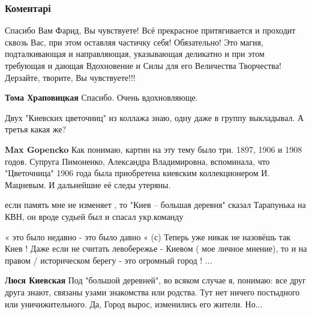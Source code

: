  
 
 
 
 
\subsubsection{Коментарі}

\begin{itemize} %

Спасибо Вам Фарид, Вы чувствуете! Всё прекрасное притягивается и проходит
сквозь Вас, при этом оставляя частичку себя! Обязательно! Это магия,
подталкивающая и направляющая, указывающая деликатно и при этом требующая и
дающая Вдохновение и Силы для его Величества Творчества! Дерзайте, творите, Вы
чувствуете!!!

\begin{itemize} %
\textbf{Тома Храповицкая}
Спасибо. Очень вдохновляюще.

\end{itemize} %

Двух "Киевских цветочниц" из коллажа знаю, одну даже в группу выкладывал. А
третья какая же?

\begin{itemize} %
\textbf{Max Gopencko}
Как понимаю, картин на эту тему было три.
1897, 1906 и 1908 годов.
Супруга Пимоненко, Александра Владимировна, вспоминала, что "Цветочница" 1906 года была приобретена киевским коллекционером И. Мацневым. И дальнейшие её следы утеряны.
\end{itemize} %

если память мне не изменяет , то "Киев – большая деревня" сказал Тарапунька на
КВН, он вроде судьей был и спасал укр.команду



« это было недавно - это было давно « (с) Теперь уже никак не назовёшь так Киев
! Даже если не считать левобережье - Киевом ( мое личное мнение), то и на
правом / историческом берегу - это огромный город ! ...

\begin{itemize} %
\textbf{Люся Киевская}
Под "большой деревней", во всяком случае я, понимаю: все друг друга знают, связаны узами знакомства или родства.
Тут нет ничего постыдного или уничижительного.
Да, Город вырос, изменились его жители. Но...
\end{itemize} %


\end{itemize}

